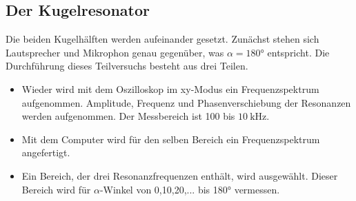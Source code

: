 \subsection{Der Kugelresonator}
Die beiden Kugelhälften werden aufeinander gesetzt. Zunächst stehen sich Lautsprecher und Mikrophon genau gegenüber, was $\alpha=180°$ entspricht. Die Durchführung dieses Teilversuchs besteht aus drei Teilen.
\begin{itemize}
  \item Wieder wird mit dem Oszilloskop im xy-Modus ein Frequenzspektrum aufgenommen. Amplitude, Frequenz und Phasenverschiebung der Resonanzen werden aufgenommen. Der Messbereich ist 100 bis $\SI{10}{\kilo\hertz}$.
  \item Mit dem Computer wird für den selben Bereich ein Frequenzspektrum angefertigt.
  \item Ein Bereich, der drei Resonanzfrequenzen enthält, wird ausgewählt. Dieser Bereich wird für $\alpha$-Winkel von 0,10,20,... bis 180° vermessen.
\end{itemize}
